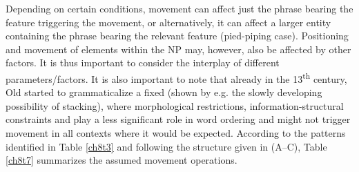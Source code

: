 \documentclass[output=paper,colorlinks,citecolor=brown]{langscibook}
\begin{document}
Depending on certain conditions, movement can affect just the phrase
bearing the feature triggering the movement, or alternatively, it can
affect a larger entity containing the phrase bearing the relevant
feature (pied-piping case). Positioning and movement of elements within
the NP may, however, also be affected by other factors. It is thus
important to consider the interplay of different parameters/factors. It
is also important to note that already in the 13\textsuperscript{th} century, Old
 started to grammaticalize a fixed  (shown by
e.g. the slowly developing possibility of  stacking), where
morphological restrictions, information-structural constraints and
 play a less significant role in word ordering and might
not trigger movement in all contexts where it would be expected.
According to the patterns identified in Table \ref{ch8t3} and following the
structure given in (A--C), Table \ref{ch8t7} summarizes the assumed movement
operations.\largerpage[-1]
\end{document}
